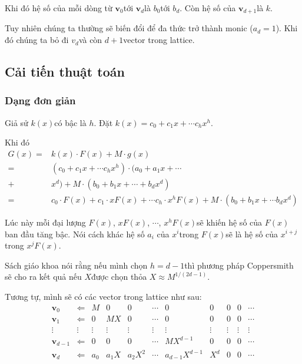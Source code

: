 Khi đó hệ số của mỗi dòng từ $\bm{v}_0$​ tới $\bm{v}_d$​ là $b_0$​ tới $b_d$​. Còn hệ số của $\bm{v}_{d+1}$​ là $k$​.

Tuy nhiên chúng ta thường sẽ biến đổi để đa thức trở thành monic ($a_d = 1$​). Khi đó chúng ta bỏ đi $v_d$​ và còn $d+1$​ vector trong lattice.

\subsection*{Cải tiến thuật toán}

\subsubsection*{Dạng đơn giản}

Giả sử $k(x)$​ có bậc là $h$​. Đặt $k(x) = c_0 + c_1 x + \cdots c_h x^h$​.

Khi đó ​
\begin{align*}
    G(x) = & k(x) \cdot F(x) + M \cdot g(x) \\
        = & (c_0 + c_1 x + \cdots c_h x^h) \cdot (a_0 + a_1 x + \cdots \\
        + & x^d) + M \cdot (b_0 + b_1 x + \cdots + b_d x^d) \\
        = & c_0 \cdot F(x) + c_1 \cdot xF(x) + \cdots c_h \cdot x^h F(x) + M \cdot (b_0 + b_1 x + \cdots b_d x^d)
\end{align*}

Lúc này mỗi đại lượng $F(x)$​, $xF(x)$​, $\cdots$​, $x^h F(x)$​ sẽ khiến hệ số của $F(x)$​ ban đầu tăng bậc. Nói cách khác hệ số $a_i$ của $x^i$​ trong $F(x)$​ sẽ là hệ số của $x^{i+j}$​ trong $x^j F(x)$​.

Sách giáo khoa nói rằng nếu mình chọn $h=d-1$​ thì phương pháp Coppersmith sẽ cho ra kết quả nếu $X$​ được chọn thỏa $X \approx M^{1/(2d-1)}$.

Tương tự, mình sẽ có các vector trong lattice như sau:
\begin{equation*}
    \begin{array}{ccccccccccc}
        \bm{v}_0 & \Leftarrow & M & 0 & 0 & \cdots & 0 & 0 & 0 & 0 & \cdots \\​
        \bm{v}_1 & \Leftarrow & 0 & MX & 0 & \cdots & 0 & 0 & 0 & 0 & \cdots \\
        \vdots & \vdots & \vdots & \vdots & \vdots & \vdots & \vdots & \vdots & \vdots & \vdots & \vdots \\
        \bm{v}_{d-1} & \Leftarrow & 0 & 0 & 0 & \cdots & MX^{d-1} & 0 & 0 & 0 & \cdots \\
        \bm{v}_d & \Leftarrow & a_0 & a_1 X & a_2 X^2 & \cdots & a_{d-1} X^{d-1} & X^d & 0 & 0 & \cdots
    \end{array}
\end{equation*}

